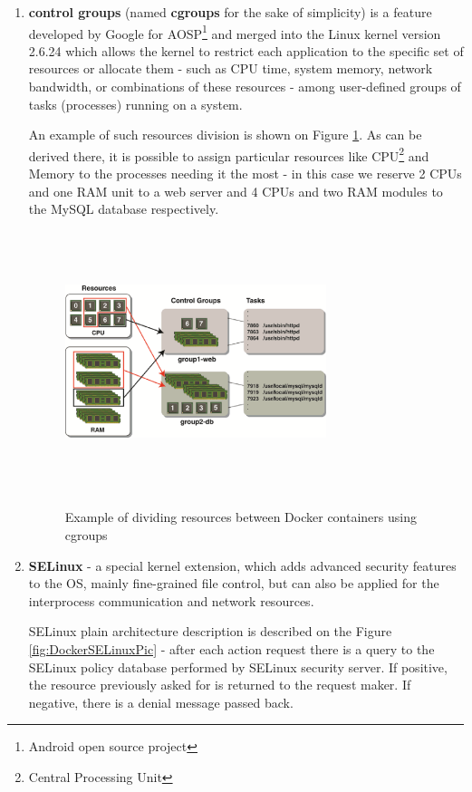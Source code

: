 \begin{enumerate}
\item \textbf{control groups} (named \textbf{cgroups} for the sake of simplicity) is
a feature developed by Google
for AOSP\footnote{Android open source project} and merged
into the Linux kernel version 2.6.24\cite{CGroupsMerged}
which allows the kernel to restrict
each application to the specific set of resources or allocate them -
such as CPU time, system memory, network bandwidth,
or combinations of these resources - among user-defined groups
of tasks (processes) running on a system\cite{CGroupsDefinition}.

An example of such resources division is
shown on Figure \ref{fig:DockerCGroupsPic}.
As can be derived there, it is possible to assign
particular resources
like CPU\footnote{Central Processing Unit} and Memory to the
processes needing it the most -
in this case we reserve 2 CPUs and one RAM
unit to a web server and 4 CPUs and two RAM modules
to the MySQL database respectively.

\begin{figure}
\includegraphics[height=3in, width=3in]{dockerCGroups}
\caption{Example of dividing resources between Docker containers using cgroups}
\cite{DockerCGroupsPic}
\label{fig:DockerCGroupsPic}
\end{figure}

\item \textbf{SELinux} - a special kernel extension, which adds advanced security features to
the OS, mainly fine-grained file control, but can also be applied
for the interprocess communication and network resources\cite{SELinuxDef}.

SELinux plain architecture description is
described on the Figure \ref{fig:DockerSELinuxPic} -
after each action request there is a query to the SELinux policy
database performed by SELinux security server. If positive, the
resource previously asked for is returned to the request maker. If negative,
there is a denial message passed back.


\end{enumerate}
